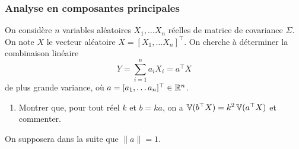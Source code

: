 \subsubsection{Analyse en composantes principales} 

On considère $n$ variables aléatoires $X_1, \dots X_n$ réelles de matrice de covariance $\Sigma$. On note $X$ le vecteur aléatoire $X = [X_1,  \dots X_n]^\top$. On cherche à déterminer la combinaison linéaire 
$$
Y = \sum_{i=1}^n a_i X_i = a^\top X
$$ 
de plus grande variance, où $a = [a_1, \dots a_n]^\top \in \mathbb{R}^n$.

\begin{enumerate}
  \item Montrer que, pour tout réel $k$ et $b = k a$, on a $\operatorname{\mathbb{V}}(b^\top X) = k^2 \operatorname{\mathbb{V}}(a^\top X)$ et commenter.
\end{enumerate}

\bigskip
\noindent On supposera dans la suite que $\|a\| = 1$.

